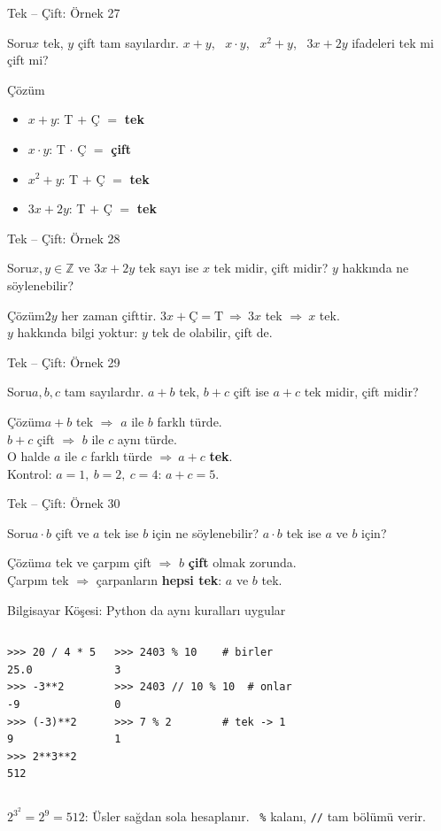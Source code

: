 \documentclass[aspectratio=169,11pt]{beamer}
\newcommand{\soru}[3]{%
\begin{frame}{#1}
  \begin{block}{Soru}\large #2\end{block}
  \pause
  \begin{exampleblock}{Çözüm}\large #3\end{exampleblock}
\end{frame}}
\begin{document}
\soru{Tek -- Çift: Örnek 27}
{\(x\) tek, \(y\) çift tam sayılardır. \(x+y\), \ \(x\cdot y\), \ \(x^2+y\), \ \(3x+2y\) ifadeleri tek mi çift mi?}
{\begin{itemize}
\item \(x+y\): T \(+\) Ç \(=\) \textbf{tek}
\item \(x\cdot y\): T \(\cdot\) Ç \(=\) \textbf{çift}
\item \(x^2+y\): T \(+\) Ç \(=\) \textbf{tek}
\item \(3x+2y\): T \(+\) Ç \(=\) \textbf{tek}
\end{itemize}}

\soru{Tek -- Çift: Örnek 28}
{\(x,y\in\mathbb{Z}\) ve \(3x+2y\) tek sayı ise \(x\) tek midir, çift midir? \(y\) hakkında ne söylenebilir?}
{\(2y\) her zaman çifttir. \(3x+\text{Ç}=\text{T}\ \Rightarrow\ 3x\) tek \(\Rightarrow\ x\) tek.\\[3pt]
\(y\) hakkında bilgi yoktur: \(y\) tek de olabilir, çift de.}

\soru{Tek -- Çift: Örnek 29}
{\(a,b,c\) tam sayılardır. \(a+b\) tek, \(b+c\) çift ise \(a+c\) tek midir, çift midir?}
{\(a+b\) tek \(\Rightarrow\) \(a\) ile \(b\) farklı türde.\\
\(b+c\) çift \(\Rightarrow\) \(b\) ile \(c\) aynı türde.\\
O halde \(a\) ile \(c\) farklı türde \(\Rightarrow\ a+c\) \textbf{tek}.\\[3pt]
Kontrol: \(a=1,\ b=2,\ c=4\): \(a+c=5\).}

\soru{Tek -- Çift: Örnek 30}
{\(a\cdot b\) çift ve \(a\) tek ise \(b\) için ne söylenebilir? \(a\cdot b\) tek ise \(a\) ve \(b\) için?}
{\(a\) tek ve çarpım çift \(\Rightarrow\) \(b\) \textbf{çift} olmak zorunda.\\[3pt]
Çarpım tek \(\Rightarrow\) çarpanların \textbf{hepsi tek}: \(a\) ve \(b\) tek.}

\begin{frame}[fragile]{Bilgisayar Köşesi: Python da aynı kuralları uygular}
\begin{columns}[t]
\begin{verbatim}
>>> 20 / 4 * 5
25.0
>>> -3**2
-9
>>> (-3)**2
9
>>> 2**3**2
512
\end{verbatim}
\begin{verbatim}
>>> 2403 % 10    # birler
3
>>> 2403 // 10 % 10  # onlar
0
>>> 7 % 2        # tek -> 1
1
\end{verbatim}
\end{columns}
\small \(2^{3^2}=2^{9}=512\): Üsler sağdan sola hesaplanır. \ \verb|%| kalanı, \verb|//| tam bölümü verir.
\end{frame}
\end{document}
